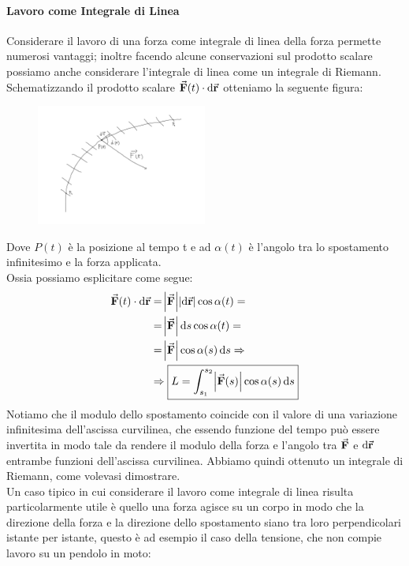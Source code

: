 \documentclass{report}
\newcommand{\then}{\ensuremath{\Rightarrow}}
\renewcommand{\r}{\va{r}}
\newcommand{\F}{\va{F}}
\begin{document}
\paragraph{Lavoro come Integrale di Linea}
Considerare il lavoro di una forza come integrale di linea della forza permette numerosi vantaggi; inoltre facendo alcune conservazioni sul prodotto scalare possiamo anche considerare l'integrale di linea come un integrale di Riemann.\\
Schematizzando il prodotto scalare $\F(t)\cdot\dif\r$ otteniamo la seguente figura:
\begin{figure}[H]
    \centering
    \includegraphics[width=0.5\textwidth]{IntegraleLinea.png}
\end{figure}
Dove $P(t)$ è la posizione al tempo t e ad $\alpha(t)$ è l'angolo tra lo spostamento infinitesimo e la forza applicata.\\
Ossia possiamo esplicitare come segue:
\begin{equation}
\begin{split}
    \F(t)\cdot\dif\r&=\abs{\F}\abs{\dif\r}\cos\alpha(t)=\\
    &=\abs{\F}\dif s\cos\alpha(t)=\\
    &=\abs{\F}\cos\alpha(s)\dif s\then\\
    &\then\boxed{L=\int_{s_1}^{s_2}\abs{\F(s)}\cos\alpha(s)\dif s}
\end{split}
\end{equation}
Notiamo che il modulo dello spostamento coincide con il valore di una variazione infinitesima dell'ascissa curvilinea, che essendo funzione del tempo può essere invertita in modo tale da rendere il modulo della forza e l'angolo tra $\F$ e $\dif\r$ entrambe funzioni dell'ascissa curvilinea. Abbiamo quindi ottenuto un integrale di Riemann, come volevasi dimostrare.\\
Un caso tipico in cui considerare il lavoro come integrale di linea risulta particolarmente utile è quello una forza agisce su un corpo in modo che la direzione della forza e la direzione dello spostamento siano tra loro perpendicolari istante per istante, questo è ad esempio il caso della tensione, che non compie lavoro su un pendolo in moto:
\end{document}
